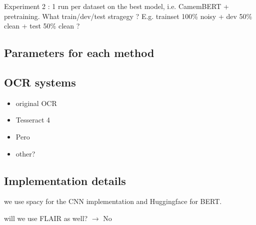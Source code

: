 Experiment 2 : 1 run per dataset on the best model, i.e. CamemBERT + pretraining.
What train/dev/test stragegy ? E.g. trainset 100\% noisy + dev 50\% clean + test 50\% clean ?
 

\subsection{Parameters for each method}

\subsection{OCR systems}
\begin{itemize}
    \item original OCR
    \item Tesseract 4
    \item Pero
    \item other?
\end{itemize}

\subsection{Implementation details}
we use spacy  for the CNN implementation and Huggingface for BERT.

will we use FLAIR as well? $\rightarrow$ No